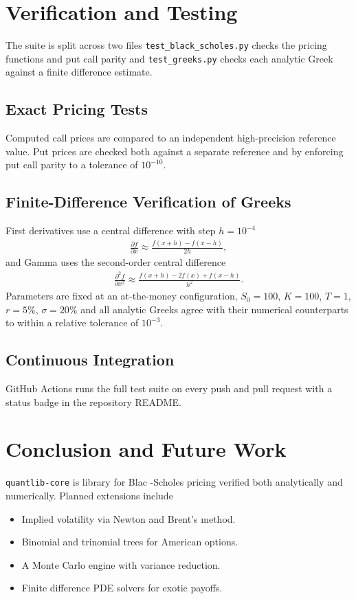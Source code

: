 \documentclass[twocolumn,10pt]{article}
\begin{document}
\section{Verification and Testing}
\label{sec:testing}

The suite is split across two files  \texttt{test\_black\_scholes.py} checks the pricing functions and put call parity and \texttt{test\_greeks.py} checks each analytic Greek against a finite difference estimate.

\subsection{Exact Pricing Tests}
Computed call prices are compared to an independent high-precision reference value. Put prices are checked both against a separate reference and by enforcing put call parity to a tolerance of $10^{-10}$.

\subsection{Finite-Difference Verification of Greeks}
First derivatives use a central difference with step $h = 10^{-4}$
\begin{align}
    \frac{\partial f}{\partial x} \approx \frac{f(x+h) - f(x-h)}{2h},
\end{align}
and Gamma uses the second-order central difference
\begin{align}
    \frac{\partial^2 f}{\partial x^2} \approx \frac{f(x+h) - 2f(x) + f(x-h)}{h^2}.
\end{align}
Parameters are fixed at an at-the-money configuration, $S_0=100$, $K=100$, $T=1$, $r=5\%$, $\sigma=20\%$ and all analytic Greeks agree with their numerical counterparts to within a relative tolerance of $10^{-3}$.

\subsection{Continuous Integration}
GitHub Actions runs the full test suite on every push and pull request with a status badge in the repository README.

\section{Conclusion and Future Work}
\label{sec:conclusion}

\texttt{quantlib-core} is library for Blac -Scholes pricing  verified both analytically and numerically. Planned extensions include
\begin{itemize}
    \item Implied volatility via Newton  and Brent's method.
    \item Binomial and trinomial trees for American options.
    \item A Monte Carlo engine with variance reduction.
    \item Finite difference PDE solvers for exotic payoffs.
\end{itemize}
\end{document}
